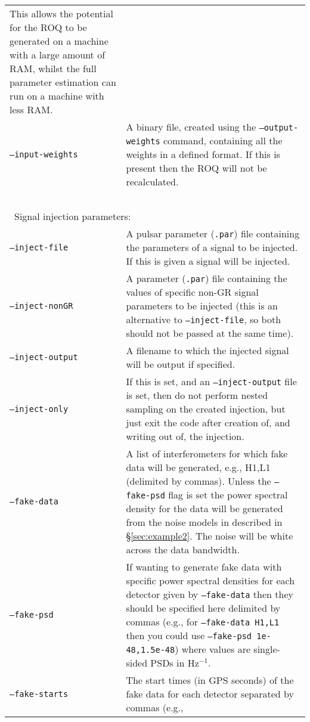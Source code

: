 \begin{footnotesize}
\begin{longtable}{|p{}p{}|}
                            This allows the potential for the ROQ to be generated on a machine with a large amount of RAM, whilst the full parameter
                            estimation can run on a machine with less RAM. \\
 {\tt --input-weights}   &  A binary file, created using the {\tt --output-weights} command, containing all the weights in a defined format.
                            If this is present then the ROQ will not be recalculated. \\
 ~ & ~ \\
\multicolumn{2}{|l|}{~Signal injection parameters:} \\
 {\tt --inject-file}     &  A pulsar parameter ({\tt .par}) file containing the parameters of a signal to be injected. If this is
                           given a signal will be injected. \\
 {\tt --inject-nonGR}    &  A parameter ({\tt .par}) file containing the values of specific non-GR signal parameters to be injected (this is an alternative to {\tt --inject-file}, so
 both should not be passed at the same time). \\
 {\tt --inject-output}   &  A filename to which the injected signal will be output if specified. \\
 {\tt --inject-only}     &  If this is set, and an {\tt --inject-output} file is set, then do not perform nested sampling on the
                            created injection, but just exit the code after creation of, and writing out of, the injection. \\
 {\tt --fake-data}       &  A list of interferometers for which fake data will be generated, e.g., H1,L1 (delimited by commas). Unless
                            the {\tt --fake-psd} flag is set the power spectral density for the data will be generated from the
                            noise models in described in \S\ref{sec:example2}. The noise will be white across the data bandwidth. \\
 {\tt --fake-psd}        &  If wanting to generate fake data with specific power spectral densities for each detector given
                            by {\tt --fake-data} then they should be specified here delimited by commas (e.g., for {\tt --fake-data H1,L1}
                            then you could use {\tt --fake-psd 1e-48,1.5e-48}) where values are single-sided PSDs in Hz$^{-1}$. \\
 {\tt --fake-starts}     &  The start times (in GPS seconds) of the fake data for each detector separated by commas (e.g.,

\end{longtable}
\end{footnotesize}
